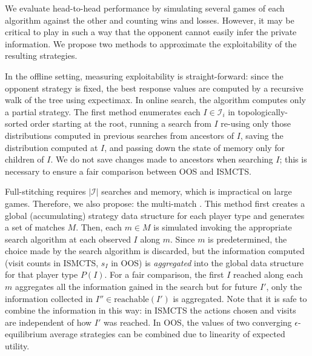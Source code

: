\documentclass[letterpaper]{article}
\newcommand{\cI}{\mathcal{I}}
\newcommand{\defword}[1]{\textbf{\boldmath{#1}}}
\newcounter{mlNoteCounter}
\newcommand{\mlnote}[1]{{\scriptsize \color{darkgreen} $\blacksquare$ \refstepcounter{mlNoteCounter}\textsf{[ML]$_{\arabic{mlNoteCounter}}$:{#1}}}}
\begin{document}

We evaluate head-to-head performance by simulating several games of each algorithm against the other
and counting wins and losses. 
However, %
it may be critical to play in such a way that the opponent cannot easily infer the private information.  
We propose two methods to approximate the exploitability of the resulting strategies. 

In the offline setting, measuring exploitability is straight-forward: since the opponent strategy is fixed, the best 
response values are computed by a recursive walk of the tree using expectimax. In online search, the algorithm computes only 
a partial strategy. 
The first \defword{full stitching} method 
enumerates each $I \in \cI_i$ in topologically-sorted order starting at the root, 
running a search from $I$ re-using only those distributions computed in previous searches from ancestors of $I$, saving the 
distribution computed at $I$, and passing down the state of memory only for children of $I$. 
We do not save changes made to ancestors when searching $I$; this is necessary to ensure 
a fair comparison between OOS and ISMCTS. 

Full-stitching requires $|\cI|$ searches and memory, which is impractical on large games. 
Therefore, we also propose: the multi-match \defword{aggregate method}. 
This method first creates a global (accumulating) strategy data structure for each player type and generates a 
set of matches $M$. Then, each $m \in M$ is simulated invoking the appropriate search algorithm at each observed 
$I$ along $m$. 
Since $m$ is predetermined, the choice made by the search algorithm is discarded, but the information computed 
(visit counts in ISMCTS, $s_I$ in OOS) is {\it aggregated} into the global data structure for that player type 
$P(I)$. 
For a fair comparison, the first $I$ reached along each $m$ aggregates all the information gained in the search 
but for future $I'$, only the information collected in $I'' \in \mbox{reachable}(I')$ is aggregated.
Note that it is safe to combine the information in this way: in ISMCTS the actions chosen and visits are independent of 
how $I'$ was reached. In OOS, the values of two converging $\epsilon$-equilibrium average strategies can be combined due to 
linearity of expected utility. 
\end{document}
